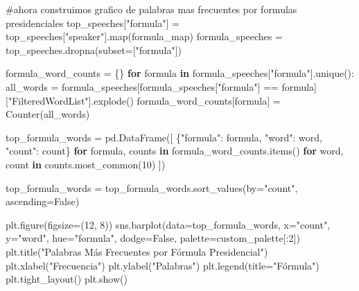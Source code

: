 \documentclass[
  letterpaper,
  DIV=11,
  numbers=noendperiod]{scrartcl}
\newenvironment{Shaded}{\begin{snugshade}}{\end{snugshade}}
\newcommand{\BuiltInTok}[1]{\textcolor[rgb]{0.00,0.23,0.31}{#1}}
\newcommand{\CommentTok}[1]{\textcolor[rgb]{0.37,0.37,0.37}{#1}}
\newcommand{\ControlFlowTok}[1]{\textcolor[rgb]{0.00,0.23,0.31}{\textbf{#1}}}
\newcommand{\DecValTok}[1]{\textcolor[rgb]{0.68,0.00,0.00}{#1}}
\newcommand{\KeywordTok}[1]{\textcolor[rgb]{0.00,0.23,0.31}{\textbf{#1}}}
\newcommand{\NormalTok}[1]{\textcolor[rgb]{0.00,0.23,0.31}{#1}}
\newcommand{\OperatorTok}[1]{\textcolor[rgb]{0.37,0.37,0.37}{#1}}
\newcommand{\StringTok}[1]{\textcolor[rgb]{0.13,0.47,0.30}{#1}}
\newcommand{\VariableTok}[1]{\textcolor[rgb]{0.07,0.07,0.07}{#1}}
\begin{document}
\begin{Shaded}
\begin{Highlighting}[]
\CommentTok{\#ahora construimos grafico de palabras mas frecuentes por formulas presidenciales}
\NormalTok{top\_speeches[}\StringTok{"formula"}\NormalTok{] }\OperatorTok{=}\NormalTok{ top\_speeches[}\StringTok{"speaker"}\NormalTok{].}\BuiltInTok{map}\NormalTok{(formula\_map)}
\NormalTok{formula\_speeches }\OperatorTok{=}\NormalTok{ top\_speeches.dropna(subset}\OperatorTok{=}\NormalTok{[}\StringTok{"formula"}\NormalTok{])}

\NormalTok{formula\_word\_counts }\OperatorTok{=}\NormalTok{ \{\}}
\ControlFlowTok{for}\NormalTok{ formula }\KeywordTok{in}\NormalTok{ formula\_speeches[}\StringTok{"formula"}\NormalTok{].unique():}
\NormalTok{    all\_words }\OperatorTok{=}\NormalTok{ formula\_speeches[formula\_speeches[}\StringTok{"formula"}\NormalTok{] }\OperatorTok{==}\NormalTok{ formula][}\StringTok{"FilteredWordList"}\NormalTok{].explode()}
\NormalTok{    formula\_word\_counts[formula] }\OperatorTok{=}\NormalTok{ Counter(all\_words)}

\NormalTok{top\_formula\_words }\OperatorTok{=}\NormalTok{ pd.DataFrame([}
\NormalTok{    \{}\StringTok{"formula"}\NormalTok{: formula, }\StringTok{"word"}\NormalTok{: word, }\StringTok{"count"}\NormalTok{: count\}}
    \ControlFlowTok{for}\NormalTok{ formula, counts }\KeywordTok{in}\NormalTok{ formula\_word\_counts.items()}
    \ControlFlowTok{for}\NormalTok{ word, count }\KeywordTok{in}\NormalTok{ counts.most\_common(}\DecValTok{10}\NormalTok{)}
\NormalTok{])}

\NormalTok{top\_formula\_words }\OperatorTok{=}\NormalTok{ top\_formula\_words.sort\_values(by}\OperatorTok{=}\StringTok{"count"}\NormalTok{, ascending}\OperatorTok{=}\VariableTok{False}\NormalTok{)}

\NormalTok{plt.figure(figsize}\OperatorTok{=}\NormalTok{(}\DecValTok{12}\NormalTok{, }\DecValTok{8}\NormalTok{))}
\NormalTok{sns.barplot(data}\OperatorTok{=}\NormalTok{top\_formula\_words, x}\OperatorTok{=}\StringTok{"count"}\NormalTok{, y}\OperatorTok{=}\StringTok{"word"}\NormalTok{, hue}\OperatorTok{=}\StringTok{"formula"}\NormalTok{, dodge}\OperatorTok{=}\VariableTok{False}\NormalTok{, palette}\OperatorTok{=}\NormalTok{custom\_palette[:}\DecValTok{2}\NormalTok{])}
\NormalTok{plt.title(}\StringTok{"Palabras Más Frecuentes por Fórmula Presidencial"}\NormalTok{)}
\NormalTok{plt.xlabel(}\StringTok{"Frecuencia"}\NormalTok{)}
\NormalTok{plt.ylabel(}\StringTok{"Palabras"}\NormalTok{)}
\NormalTok{plt.legend(title}\OperatorTok{=}\StringTok{"Fórmula"}\NormalTok{)}
\NormalTok{plt.tight\_layout()}
\NormalTok{plt.show()}
\end{Highlighting}
\end{Shaded}
\end{document}
